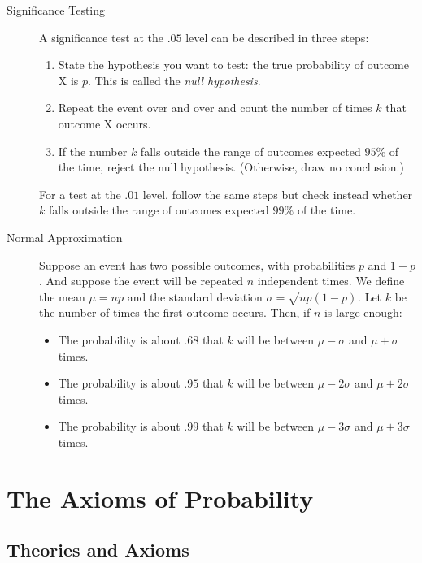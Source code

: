 \documentclass[justified]{tufte-book}
\providecommand{\tightlist}{%
  \setlength{\itemsep}{0pt}\setlength{\parskip}{0pt}}
\theoremstyle{definition}
\theoremstyle{definition}
\theoremstyle{definition}
\theoremstyle{remark}
\begin{document}
\begin{description}
\item[Significance Testing]
A significance test at the \(.05\) level can be described in three steps:

\begin{enumerate}
\def\labelenumi{\arabic{enumi}.}
\tightlist
\item
  State the hypothesis you want to test: the true probability of outcome X is \(p\). This is called the \emph{null hypothesis}.
\item
  Repeat the event over and over and count the number of times \(k\) that outcome X occurs.
\item
  If the number \(k\) falls outside the range of outcomes expected \(95\%\) of the time, reject the null hypothesis. (Otherwise, draw no conclusion.)
\end{enumerate}

For a test at the \(.01\) level, follow the same steps but check instead whether \(k\) falls outside the range of outcomes expected \(99\%\) of the time.
\item[Normal Approximation]
Suppose an event has two possible outcomes, with probabilities \(p\) and \(1-p\). And suppose the event will be repeated \(n\) independent times. We define the mean \(\mu = np\) and the standard deviation \(\sigma = \sqrt{np(1-p)}\). Let \(k\) be the number of times the first outcome occurs. Then, if \(n\) is large enough:

\begin{itemize}
\tightlist
\item
  The probability is about \(.68\) that \(k\) will be between \(\mu - \sigma\) and \(\mu + \sigma\) times.
\item
  The probability is about \(.95\) that \(k\) will be between \(\mu - 2\sigma\) and \(\mu + 2\sigma\) times.
\item
  The probability is about \(.99\) that \(k\) will be between \(\mu - 3\sigma\) and \(\mu + 3\sigma\) times.
\end{itemize}
\end{description}

\hypertarget{the-axioms-of-probability}{%
\chapter{The Axioms of Probability}\label{the-axioms-of-probability}}

\hypertarget{theories-and-axioms}{%
\section*{Theories and Axioms}\label{theories-and-axioms}}
\end{document}
